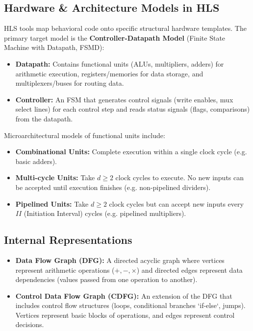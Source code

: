 \documentclass[12pt,a4paper]{article}
\begin{document}
\subsection{Hardware \& Architecture Models in HLS}
HLS tools map behavioral code onto specific structural hardware templates. The primary target model is the \textbf{Controller-Datapath Model} (Finite State Machine with Datapath, FSMD):
\begin{itemize}[leftmargin=*, itemsep=3pt]
  \item \textbf{Datapath:} Contains functional units (ALUs, multipliers, adders) for arithmetic execution, registers/memories for data storage, and multiplexers/buses for routing data.
  \item \textbf{Controller:} An FSM that generates control signals (write enables, mux select lines) for each control step and reads status signals (flags, comparisons) from the datapath.
\end{itemize}
Microarchitectural models of functional units include:
\begin{itemize}[leftmargin=*, itemsep=2pt]
  \item \textbf{Combinational Units:} Complete execution within a single clock cycle (e.g. basic adders).
  \item \textbf{Multi-cycle Units:} Take $d \ge 2$ clock cycles to execute. No new inputs can be accepted until execution finishes (e.g. non-pipelined dividers).
  \item \textbf{Pipelined Units:} Take $d \ge 2$ clock cycles but can accept new inputs every $II$ (Initiation Interval) cycles (e.g. pipelined multipliers).
\end{itemize}

\subsection{Internal Representations}
\begin{itemize}[leftmargin=*, itemsep=2pt]
  \item \textbf{Data Flow Graph (DFG):} A directed acyclic graph where vertices represent arithmetic operations ($+, -, \times$) and directed edges represent data dependencies (values passed from one operation to another).
  \item \textbf{Control Data Flow Graph (CDFG):} An extension of the DFG that includes control flow structures (loops, conditional branches `if-else`, jumps). Vertices represent basic blocks of operations, and edges represent control decisions.
\end{itemize}
\end{document}
